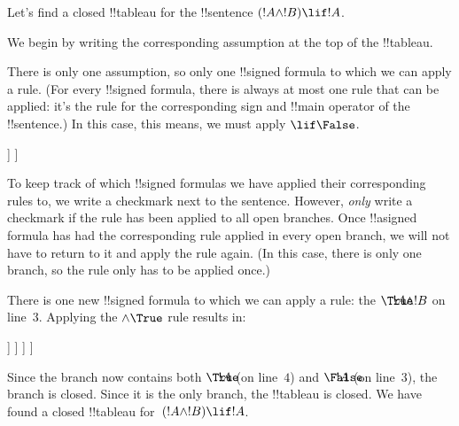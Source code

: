\documentclass[../../../include/open-logic-section]{subfiles}
\begin{document}


\begin{ex}
Let's find a closed !!{tableau} for the !!{sentence} $(!A \land !B) \lif !A$.

We begin by writing the corresponding assumption at the top of the
!!{tableau}.
\begin{oltableau}
  [\sFmla{\False}{(\formula{A} \land \formula{B}) \lif \formula{A}},
    just = \TAss]
\end{oltableau}

There is only one assumption, so only one !!{signed formula} to which
we can apply a rule. (For every !!{signed formula}, there is always at
most one rule that can be applied: it's the rule for the corresponding
sign and !!{main operator} of the !!{sentence}.) In this case, this
means, we must apply $\TRule{\False}{\lif}$.
\begin{oltableau}
  [\sFmla{\False}{(\formula{A} \land \formula{B}) \lif \formula{A}},
    checked, just = \TAss
    [\sFmla{\True}{\formula{A} \land \formula{B}},
      just={\TRule{\False}{\lif}[1]}
      [\sFmla{\False}{\formula{A}}, just={\TRule{\False}{\lif}[1]}]
    ]
  ]
\end{oltableau}
To keep track of which !!{signed formula}s we have applied their
corresponding rules to, we write a checkmark next to the
sentence. However, \emph{only} write a checkmark if the rule has been
applied to all open branches. Once !!a{signed formula} has had the
corresponding rule applied in every open branch, we will not have to
return to it and apply the rule again. (In this case, there is only
one branch, so the rule only has to be applied once.)

There is one new !!{signed formula} to which we can apply a rule: the
$\sFmla{\True}{!A \land !B}$ on line~$3$. Applying the
$\TRule{\True}{\land}$ rule results in:
\begin{oltableau}
  [\sFmla{\False}{(\formula{A} \land \formula{B}) \lif \formula{A}},
    checked, just = \TAss
    [\sFmla{\True}{\formula{A} \land \formula{B}},
      just={\TRule{\False}{\lif}[1]}, checked
      [\sFmla{\False}{\formula{A}}, just={\TRule{\False}{\lif}[1]}
        [\sFmla{\True}{\formula{A}}, just={\TRule{\True}{\land}[2]}
          [\sFmla{\True}{\formula{B}}, just={\TRule{\True}{\land}[2]}, close
          ]
        ]
      ]
    ]
  ]
\end{oltableau}
Since the branch now contains both $\sFmla{\True}{!A}$ (on line~$4$)
and $\sFmla{\False}{!A}$ (on line~$3$), the branch is closed. Since it
is the only branch, the !!{tableau} is closed. We have found
a closed !!{tableau} for~$(!A \land !B) \lif !A$.
\end{ex}
\end{document}
